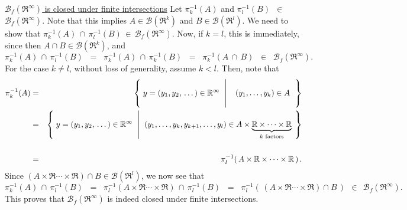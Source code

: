 \begin{enumerate}
	\vskip 0.1cm
	\noindent
	\underline{$\mathcal{B}_{f}\!\left(\Re^{\infty}\right)$ is closed under finite intersections}
	\vskip 0.0cm
	\noindent
	Let $\pi^{-1}_{k}(A)$ and $\pi^{-1}_{l}(B)$ \,$\in$\, $\mathcal{B}_{f}(\Re^{\infty})$.
	Note that this implies $A \in \mathcal{B}(\Re^{k})$ and $B \in \mathcal{B}(\Re^{l})$.
	We need to show that
	$\pi^{-1}_{k}(A) \,\cap\, \pi^{-1}_{l}(B) \,\in\, \mathcal{B}_{f}(\Re^{\infty})$.
	Now, if $k = l$, this is immediately, since then $A \cap B \in \mathcal{B}(\Re^{k})$, and
	\begin{equation*}
	\pi^{-1}_{k}(A) \,\cap\, \pi^{-1}_{l}(B)
	\;\; = \;\; \pi^{-1}_{k}(A) \,\cap\, \pi^{-1}_{k}(B)
	\;\; = \;\; \pi^{-1}_{k}(A\,\cap\,B)
	\;\; \in \;\; \mathcal{B}_{f}(\Re^{\infty}).
	\end{equation*}
	For the case $k \neq l$, without loss of generality, assume $k < l$.
	Then, note that
	\begin{eqnarray*}
	\pi_{k}^{-1}(A)
	&=& \left\{\;
		y=(y_{1},y_{2},\,\ldots\,)\in\Re^{\infty}
		\;\,\left\vert\;\;
		\begin{array}{c} \mbox{} \\ (y_{1},\ldots,y_{k})\in A \\ \mbox{} \end{array}
		\right.\right\}
	\\
	&=& \left\{\;
		y=(y_{1},y_{2},\,\ldots\,)\in\Re^{\infty}
		\;\,\left\vert\;\;
		(y_{1},\ldots,y_{k},y_{k+1},\ldots,y_{l})
		\in A\times \underset{\textnormal{$k$ factors}}{\underbrace{\Re\times\cdots\times\Re}}
		\right.\;\right\}
	\\ \\
	&=& \pi^{-1}_{l}\!\left(\,A\times\Re\times\cdots\times\Re\,\right).
	\end{eqnarray*}
	Since $(A \times \Re \cdots \times \Re) \cap B \in \mathcal{B}(\Re^{l})$,
	we now see that
	\begin{equation*}
	\pi^{-1}_{k}(A) \,\cap\, \pi^{-1}_{l}(B)
	\;\;=\;\; \pi^{-1}_{l}(A \times \Re \cdots \times \Re) \,\cap\, \pi^{-1}_{l}(B)
	\;\;=\;\; \pi^{-1}_{l}(\,(A \times \Re \cdots \times \Re) \cap B\,)
	\;\,\in\;\, \mathcal{B}_{f}(\Re^{\infty}).
	\end{equation*}
	This proves that $\mathcal{B}_{f}(\Re^{\infty})$ is indeed closed under finite intersections.


\end{enumerate}
